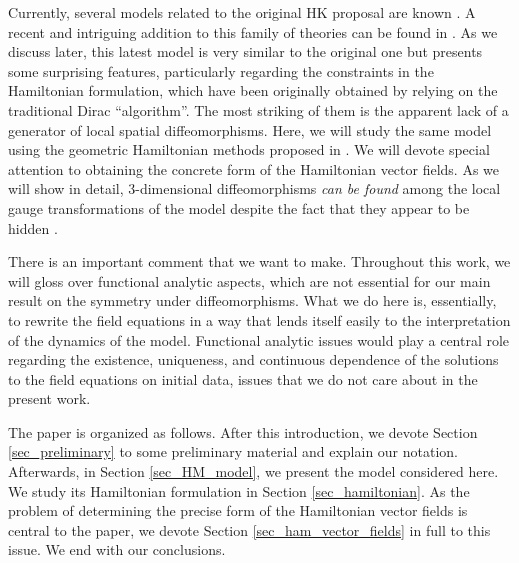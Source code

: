\documentclass[12pt]{amsart}
\theoremstyle{plain}
\theoremstyle{definition}
\theoremstyle{remark}
\numberwithin{equation}{section}  %
\begin{document}
Currently, several models related to the original HK proposal are known \cite{H,nosT,nosT2}. A recent and intriguing addition to this family of theories can be found in \cite{HM}. As we discuss later, this latest model is very similar to the original one but presents some surprising features, particularly regarding the constraints in the Hamiltonian formulation, which have been originally obtained by relying on the traditional Dirac ``algorithm''. The most striking of them is the apparent lack of a generator of local spatial diffeomorphisms. Here, we will study the same model using the geometric Hamiltonian methods proposed in \cite{GNH1,GNH2,GNH3,margalef2018towards,BPV}. We will devote special attention to obtaining the concrete form of the Hamiltonian vector fields. As we will show in detail, 3-dimensional diffeomorphisms \textit{can be found} among the local gauge transformations of the model despite the fact that they appear to be hidden \cite{HM}. 

There is an important comment that we want to make. Throughout this work, we will gloss over functional analytic aspects, which are not essential for our main result on the symmetry under diffeomorphisms. What we do here is, essentially, to rewrite the field equations in a way that lends itself easily to the interpretation of the dynamics of the model. Functional analytic issues would play a central role regarding the existence, uniqueness, and continuous dependence of the solutions to the field equations on initial data, issues that we do not care about in the present work. 

The paper is organized as follows. After this introduction, we devote Section \ref{sec_preliminary} to some preliminary material and explain our notation. Afterwards, in Section \ref{sec_HM_model}, we present the model considered here. We study its Hamiltonian formulation in Section \ref{sec_hamiltonian}. As the problem of determining the precise form of the Hamiltonian vector fields is central to the paper, we devote Section \ref{sec_ham_vector_fields} in full to this issue. We end with our conclusions.

%
%
\end{document}
